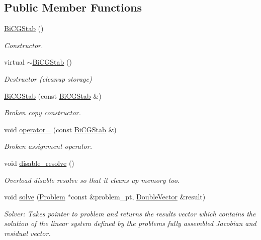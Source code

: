 \subsection*{Public Member Functions}
\begin{DoxyCompactItemize}
\item 
\hyperlink{classoomph_1_1BiCGStab_ae2ed7dfe942fb9947a14ddb0274a0bb5}{Bi\+C\+G\+Stab} ()
\begin{DoxyCompactList}\small\item\em Constructor. \end{DoxyCompactList}\item 
virtual \hyperlink{classoomph_1_1BiCGStab_a79d6bd465113ebb2000d44bd08fcadc7}{$\sim$\+Bi\+C\+G\+Stab} ()
\begin{DoxyCompactList}\small\item\em Destructor (cleanup storage) \end{DoxyCompactList}\item 
\hyperlink{classoomph_1_1BiCGStab_a8b97ca7e38f6f39c47b3dcb2afc87a48}{Bi\+C\+G\+Stab} (const \hyperlink{classoomph_1_1BiCGStab}{Bi\+C\+G\+Stab} \&)
\begin{DoxyCompactList}\small\item\em Broken copy constructor. \end{DoxyCompactList}\item 
void \hyperlink{classoomph_1_1BiCGStab_a3b99e41f431ac8775c1eafe9a67edf54}{operator=} (const \hyperlink{classoomph_1_1BiCGStab}{Bi\+C\+G\+Stab} \&)
\begin{DoxyCompactList}\small\item\em Broken assignment operator. \end{DoxyCompactList}\item 
void \hyperlink{classoomph_1_1BiCGStab_a7ed3198928966fddf84e9f908b3361d4}{disable\+\_\+resolve} ()
\begin{DoxyCompactList}\small\item\em Overload disable resolve so that it cleans up memory too. \end{DoxyCompactList}\item 
void \hyperlink{classoomph_1_1BiCGStab_a56e2df052fee2e26ffec644ad9161864}{solve} (\hyperlink{classoomph_1_1Problem}{Problem} $\ast$const \&problem\+\_\+pt, \hyperlink{classoomph_1_1DoubleVector}{Double\+Vector} \&result)
\begin{DoxyCompactList}\small\item\em Solver\+: Takes pointer to problem and returns the results vector which contains the solution of the linear system defined by the problem\textquotesingle{}s fully assembled Jacobian and residual vector. \end{DoxyCompactList}\item 

\end{DoxyCompactItemize}

